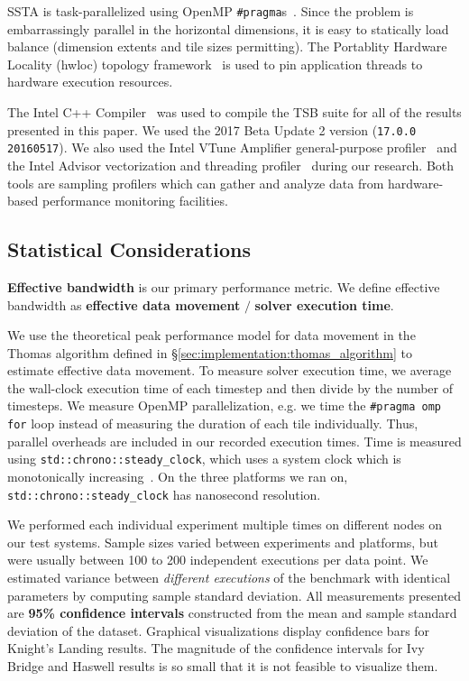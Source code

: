 \documentclass{sig-alternate-05-2015}
\begin{document}
SSTA is task-parallelized using OpenMP \lstinline{#pragma}s~\cite{openmp}.
Since the problem is embarrassingly parallel in the horizontal dimensions, it
  is easy to statically load balance (dimension extents and tile sizes
  permitting).
The Portablity Hardware Locality (hwloc) topology
  framework~\cite{hwloc} is used to pin application threads to hardware execution
  resources.

The Intel C++ Compiler~\cite{intel_cpp_compiler} was used to compile the TSB
  suite for all of the results presented in this paper.
We used the 2017 Beta Update 2 version (\lstinline{17.0.0 20160517}).
We also used the Intel VTune Amplifier general-purpose
  profiler~\cite{intel_vtune_amplifier} and the Intel Advisor vectorization and
  threading profiler~\cite{intel_advisor} during our research.
Both tools are sampling profilers which can gather and analyze data from
  hardware-based performance monitoring facilities.

\subsection{Statistical Considerations}
\label{sec:experimental_setup:stats}

\textbf{Effective bandwidth} is our primary performance metric.
We define effective bandwidth as \textbf{effective data movement} \(/\)
  \textbf{solver execution time}.

We use the theoretical peak performance model for data movement in the Thomas
  algorithm defined in \S\ref{sec:implementation:thomas_algorithm} to estimate
  effective data movement.
To measure solver execution time, we average the wall-clock execution time of
  each timestep and then divide by the number of timesteps.
We measure OpenMP parallelization, e.g. we time the \lstinline{#pragma omp for}
  loop instead of measuring the duration of each tile individually.
Thus, parallel overheads are included in our recorded execution times.
Time is measured using \lstinline{std::chrono::steady_clock}, which uses a
  system clock which is monotonically increasing~\cite{cppreference_chrono_steady_clock}.
On the three platforms we ran on, \lstinline{std::chrono::steady_clock} has
  nanosecond resolution.

We performed each individual experiment multiple times on different nodes on
  our test systems.
Sample sizes varied between experiments and platforms, but were usually between
  100 to 200 independent executions per data point.
We estimated variance between \emph{different
  executions} of the benchmark with identical parameters by computing sample
  standard deviation.
All measurements presented are \textbf{95\% confidence intervals} constructed
  from the mean and sample standard deviation of the dataset.
Graphical visualizations display confidence bars for Knight's Landing results.
The magnitude of the confidence intervals for Ivy Bridge and Haswell results is
  so small that it is not feasible to visualize them.~\cite{benchmarking_cpp_code}
\end{document}
